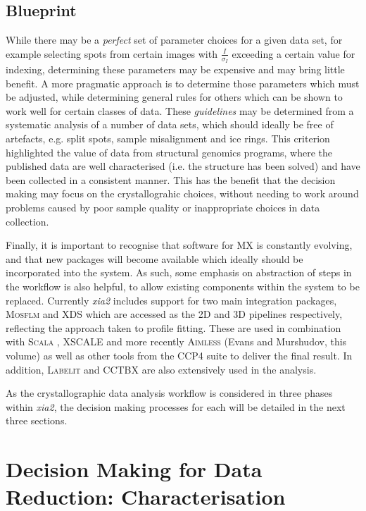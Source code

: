 \documentclass[preprint,pdf]{iucr}
\begin{document}
\subsection{Blueprint}

While there may be a \emph{perfect} set of parameter choices for a
given data set, for example selecting spots from certain images with
$\frac{I}{\sigma_I}$ exceeding a certain value for indexing,
determining these parameters may be expensive and may bring little
benefit. A more pragmatic approach is to determine those parameters
which must be adjusted, while determining general rules for others
which can be shown to work well for certain classes of data.
These \emph{guidelines} may be determined from a systematic
analysis of a number of data sets, which should ideally be free of
artefacts, e.g. split spots, sample misalignment and ice rings. 
This criterion highlighted the value of data from 
structural genomics programs, where the published data are well
characterised (i.e. the structure has been solved) and have been
collected in a consistent manner. This has the benefit that the
decision making may focus on the crystallograhic choices, without
needing to work around problems caused by poor sample quality or
inappropriate choices in data collection. 

Finally, it is important to recognise that software for MX is
constantly evolving, and that new packages will become available which
ideally should be incorporated into the system. As such, some emphasis
on abstraction of steps in the workflow is also helpful, to allow
existing components within the system to be replaced. Currently \emph{xia2} 
includes support for two main integration packages, \textsc{Mosflm}
\cite{leslie1992rcm} and XDS \cite{Kabsch:dz5179}
which are accessed as the 2D and 3D
pipelines respectively, reflecting the approach taken to profile
fitting. These are used in combination with \textsc{Scala} \cite{Evans:ba5084}, XSCALE
and more recently \textsc{Aimless} (Evans and Murshudov, this volume) as well
as other
tools from the CCP4 suite to deliver the final result. In
addition, \textsc{Labelit} \cite{Sauter:dd5008} and CCTBX
\cite{Grosse-Kunstleve:ks0118} are also 
extensively used in the analysis.

As the crystallographic data analysis workflow is considered in three
phases within \emph{xia2}, the decision making processes for each will
be detailed in the next three sections.

\section{Decision Making for Data Reduction: Characterisation}
\end{document}
